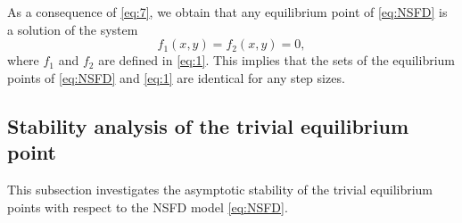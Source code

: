 \documentclass[12pt]{article}
\theoremstyle{definition}
\theoremstyle{remark}
\numberwithin{equation}{section}
\begin{document}
As a consequence of \eqref{eq:7}, we obtain that any equilibrium point of \eqref{eq:NSFD} is a solution of the system
\begin{equation*}
f_1(x, y) = f_2(x, y) = 0,
\end{equation*}
where $f_1$ and $f_2$ are defined in \eqref{eq:1}. This implies that the sets of the equilibrium points of \eqref{eq:NSFD} and \eqref{eq:1} are identical for any step sizes.

\subsection{Stability analysis of the trivial equilibrium point}\label{Subsec2.2}
This subsection investigates the asymptotic stability of the trivial equilibrium points with respect to the NSFD model \eqref{eq:NSFD}.
\end{document}
